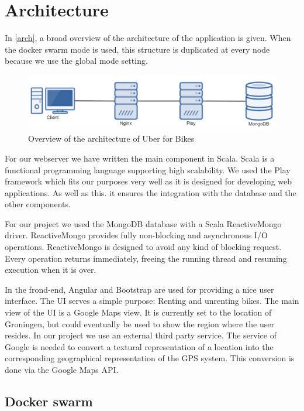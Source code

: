 \section{Architecture}
In \autoref{arch}, a broad overview of the architecture of the application is given. When the docker swarm mode is used, this structure is duplicated at every node because we use the global mode setting.

    \begin{figure}[H]
		\centering
		\includegraphics[width=1.0\textwidth]{images/Architecture.png}
		\caption{Overview of the architecture of Uber for Bikes}
		\label{arch}
	\end{figure}

For our webserver we have written the main component in Scala. Scala is a functional programming language supporting high scalability. We used the Play framework which fits our purposes very well as it is designed for developing web applications.  As well as this. it ensures the integration with the database and the other components.

For our project we used the MongoDB database with a Scala ReactiveMongo driver. ReactiveMongo provides fully non-blocking and asynchronous I/O operations. ReactiveMongo is designed to avoid any kind of blocking request. Every operation returns immediately, freeing the running thread and resuming execution when it is over.

In the frond-end, Angular and Bootstrap are used for providing a nice user interface. The UI serves a simple purpose: Renting and unrenting bikes. The main view of the UI is a Google Maps view. It is currently set to the location of Groningen, but could eventually be used to show the region where the user resides.
In our project we use an external third party service. The service of Google is needed to convert a textural representation of a location into the corresponding geographical representation of the GPS system. This conversion is done via the Google Maps API.


\subsection{Docker swarm}

